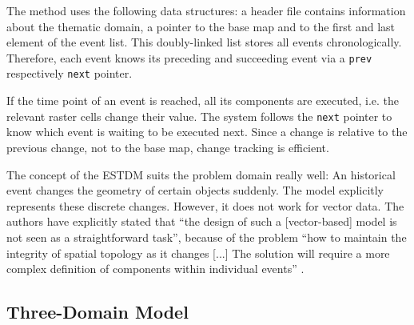 The method uses the following data structures: a header file contains information about the thematic domain, a pointer to the base map and to the first and last element of the event list. This doubly-linked list stores all events chronologically. Therefore, each event knows its preceding and succeeding event via a \texttt{prev} respectively \texttt{next} pointer.

If the time point of an event is reached, all its components are executed, i.e. the relevant raster cells change their value. The system follows the \texttt{next} pointer to know which event is waiting to be executed next. Since a change is relative to the previous change, not to the base map, change tracking is efficient.

The concept of the ESTDM suits the problem domain really well: An historical event changes the geometry of certain objects suddenly. The model explicitly represents these discrete changes. However, it does not work for vector data. The authors have explicitly stated that ``the design of such a [vector-based] model is not seen as a straightforward task'', because of the problem ``how to maintain the integrity of spatial topology as it changes [...] The solution will require a more complex definition of components within individual events''
\cite[p. 21]{peuquet95}.



\subsection{Three-Domain Model} %
\label{sub:three_domain_model}

